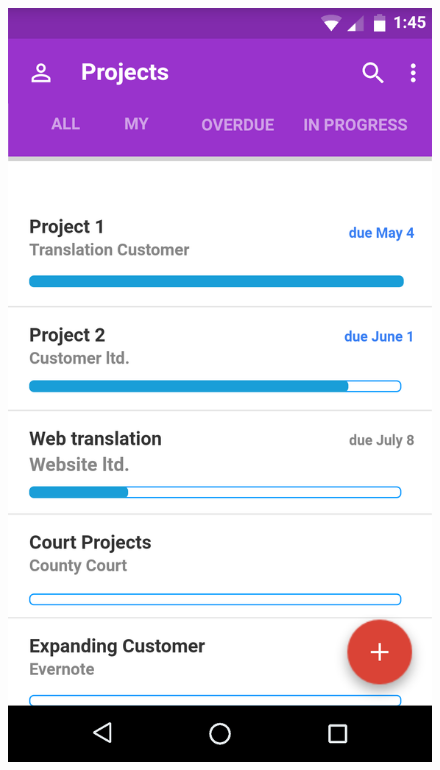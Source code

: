 \begin{figure}
	\centering
	\begin{minipage}{.5\textwidth}
		\centering
		\includegraphics[width=.74\linewidth]{pics/protoProjects}


\end{minipage}
\end{figure}

